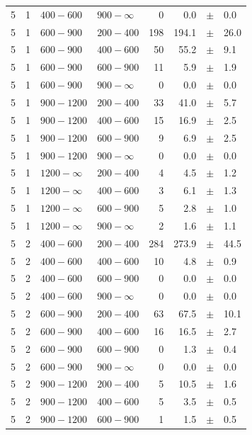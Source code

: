 \begin{table}[!h]
\begin{tabular}{rrllrrcl}
5 & 1 & $ 400- 600$ & $900-\infty$ &      0 &      0.0 &$\pm$&    0.0 \\
5 & 1 & $ 600- 900$ & $200-400$ &    198 &    194.1 &$\pm$&   26.0 \\
5 & 1 & $ 600- 900$ & $400-600$ &     50 &     55.2 &$\pm$&    9.1 \\
5 & 1 & $ 600- 900$ & $600-900$ &     11 &      5.9 &$\pm$&    1.9 \\
5 & 1 & $ 600- 900$ & $900-\infty$ &      0 &      0.0 &$\pm$&    0.0 \\
5 & 1 & $ 900-1200$ & $200-400$ &     33 &     41.0 &$\pm$&    5.7 \\
5 & 1 & $ 900-1200$ & $400-600$ &     15 &     16.9 &$\pm$&    2.5 \\
5 & 1 & $ 900-1200$ & $600-900$ &      9 &      6.9 &$\pm$&    2.5 \\
5 & 1 & $ 900-1200$ & $900-\infty$ &      0 &      0.0 &$\pm$&    0.0 \\
5 & 1 & $1200- \infty$ & $200-400$ &      4 &      4.5 &$\pm$&    1.2 \\
5 & 1 & $1200- \infty$ & $400-600$ &      3 &      6.1 &$\pm$&    1.3 \\
5 & 1 & $1200- \infty$ & $600-900$ &      5 &      2.8 &$\pm$&    1.0 \\
5 & 1 & $1200- \infty$ & $900-\infty$ &      2 &      1.6 &$\pm$&    1.1 \\
5 & 2 & $ 400- 600$ & $200-400$ &    284 &    273.9 &$\pm$&   44.5 \\
5 & 2 & $ 400- 600$ & $400-600$ &     10 &      4.8 &$\pm$&    0.9 \\
5 & 2 & $ 400- 600$ & $600-900$ &      0 &      0.0 &$\pm$&    0.0 \\
5 & 2 & $ 400- 600$ & $900-\infty$ &      0 &      0.0 &$\pm$&    0.0 \\
5 & 2 & $ 600- 900$ & $200-400$ &     63 &     67.5 &$\pm$&   10.1 \\
5 & 2 & $ 600- 900$ & $400-600$ &     16 &     16.5 &$\pm$&    2.7 \\
5 & 2 & $ 600- 900$ & $600-900$ &      0 &      1.3 &$\pm$&    0.4 \\
5 & 2 & $ 600- 900$ & $900-\infty$ &      0 &      0.0 &$\pm$&    0.0 \\
5 & 2 & $ 900-1200$ & $200-400$ &      5 &     10.5 &$\pm$&    1.6 \\
5 & 2 & $ 900-1200$ & $400-600$ &      5 &      3.5 &$\pm$&    0.5 \\
5 & 2 & $ 900-1200$ & $600-900$ &      1 &      1.5 &$\pm$&    0.5 \\

\end{tabular}
\end{table}
